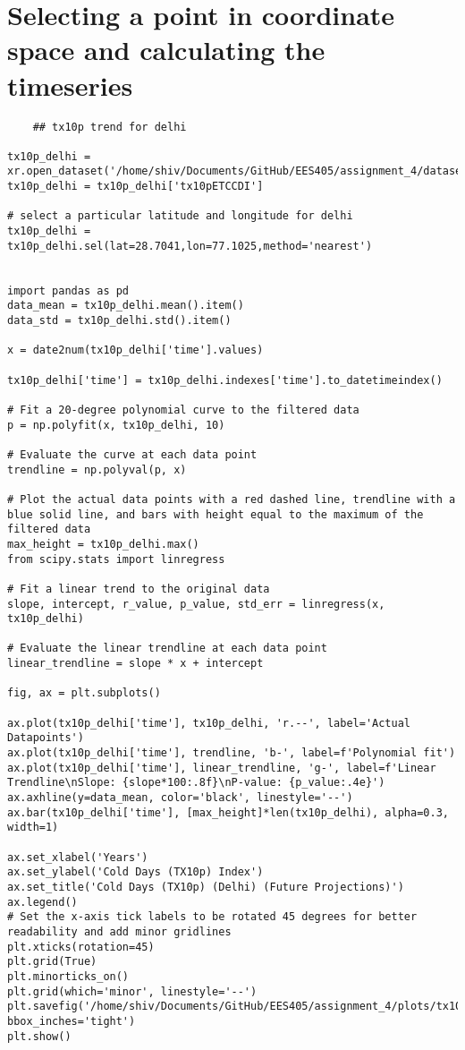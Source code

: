 \documentclass[a4paper, 12pt, twoside]{report}
\begin{document}
\section{Selecting a point in coordinate space and calculating the timeseries}

\begin{lstlisting}
    ## tx10p trend for delhi 

tx10p_delhi = xr.open_dataset('/home/shiv/Documents/GitHub/EES405/assignment_4/datasets/tx10p.india.future.nc')
tx10p_delhi = tx10p_delhi['tx10pETCCDI']

# select a particular latitude and longitude for delhi 
tx10p_delhi = tx10p_delhi.sel(lat=28.7041,lon=77.1025,method='nearest')


import pandas as pd
data_mean = tx10p_delhi.mean().item()
data_std = tx10p_delhi.std().item()

x = date2num(tx10p_delhi['time'].values)

tx10p_delhi['time'] = tx10p_delhi.indexes['time'].to_datetimeindex()

# Fit a 20-degree polynomial curve to the filtered data
p = np.polyfit(x, tx10p_delhi, 10)

# Evaluate the curve at each data point
trendline = np.polyval(p, x)

# Plot the actual data points with a red dashed line, trendline with a blue solid line, and bars with height equal to the maximum of the filtered data
max_height = tx10p_delhi.max()
from scipy.stats import linregress

# Fit a linear trend to the original data
slope, intercept, r_value, p_value, std_err = linregress(x, tx10p_delhi)

# Evaluate the linear trendline at each data point
linear_trendline = slope * x + intercept

fig, ax = plt.subplots()

ax.plot(tx10p_delhi['time'], tx10p_delhi, 'r.--', label='Actual Datapoints')
ax.plot(tx10p_delhi['time'], trendline, 'b-', label=f'Polynomial fit')
ax.plot(tx10p_delhi['time'], linear_trendline, 'g-', label=f'Linear Trendline\nSlope: {slope*100:.8f}\nP-value: {p_value:.4e}')
ax.axhline(y=data_mean, color='black', linestyle='--')
ax.bar(tx10p_delhi['time'], [max_height]*len(tx10p_delhi), alpha=0.3, width=1)

ax.set_xlabel('Years')
ax.set_ylabel('Cold Days (TX10p) Index')
ax.set_title('Cold Days (TX10p) (Delhi) (Future Projections)')
ax.legend()
# Set the x-axis tick labels to be rotated 45 degrees for better readability and add minor gridlines
plt.xticks(rotation=45)
plt.grid(True)
plt.minorticks_on()
plt.grid(which='minor', linestyle='--')
plt.savefig('/home/shiv/Documents/GitHub/EES405/assignment_4/plots/tx10p.delhi_fut.png',dpi=600, bbox_inches='tight')
plt.show()

\end{lstlisting}


\clearpage

\newpage




\end{document}
